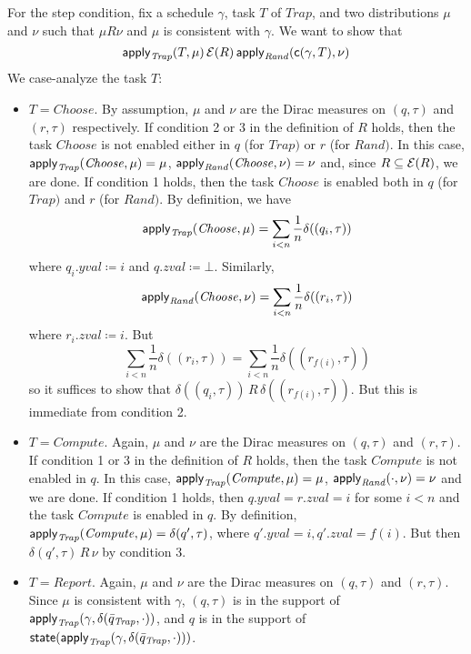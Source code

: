 \documentclass[10pt]{article}
\begin{document}
For the step condition, fix a schedule $\gamma$, task $T$ of $\mathit{Trap}$, and two distributions $\mu$ and $\nu$ such that $\mu R \nu$ and $\mu$ is consistent with $\gamma$. We want to show that 
\[ \mathsf{apply}_\mathit{Trap}(T,\mu) \, \mathcal{E}(R) \, \mathsf{apply}_\mathit{Rand}(\mathsf{c}(\gamma,T),\nu) \]
We case-analyze the task $T$:
\begin{itemize}
\item $T = \mathit{Choose}$. By assumption, $\mu$ and $\nu$ are the Dirac measures on $(q,\tau)$ and $(r,\tau)$ respectively. If condition 2 or 3 in the definition of $R$ holds, then the task $\mathit{Choose}$ is not enabled either in $q$ (for $\mathit{Trap})$ or $r$ (for $\mathit{Rand})$. In this case, $\mathsf{apply}_\mathit{Trap}(\mathit{Choose},\mu) = \mu$, $\mathsf{apply}_\mathit{Rand}(\mathit{Choose},\nu) = \nu$ and, since $R \subseteq \mathcal{E}(R)$, we are done. If condition 1 holds, then the task $\mathit{Choose}$ is enabled both in $q$ (for $\mathit{Trap})$ and $r$ (for $\mathit{Rand})$. By definition, we have
\[ \mathsf{apply}_\mathit{Trap}(\mathit{Choose},\mu) = \sum\limits_{i<n} \frac{1}{n} \delta((q_i,\tau)) \]
where $q_i.yval \coloneqq i$ and $q.zval \coloneqq \bot$. Similarly,
\[ \mathsf{apply}_\mathit{Rand}(\mathit{Choose},\nu) = \sum\limits_{i<n} \frac{1}{n} \delta((r_i,\tau)) \]
where $r_i.zval \coloneqq i$. But
\[ \sum\limits_{i<n} \frac{1}{n} \delta((r_i,\tau)) = \sum\limits_{i<n} \frac{1}{n} \delta((r_{f(i)},\tau)) \]
so it suffices to show that $\delta((q_i,\tau)) \, R \, \delta((r_{f(i)},\tau))$. But this is immediate from condition 2.
\item $T = \mathit{Compute}$. Again, $\mu$ and $\nu$ are the Dirac measures on $(q,\tau)$ and $(r,\tau)$. If condition 1 or 3 in the definition of $R$ holds, then the task $\mathit{Compute}$ is not enabled in $q$. In this case, $\mathsf{apply}_\mathit{Trap}(\mathit{Compute},\mu) = \mu$, $\mathsf{apply}_\mathit{Rand}(\cdot,\nu) = \nu$ and we are done. If condition 1 holds, then $q.yval = r.zval = i$ for some $i < n$ and the task $\mathit{Compute}$ is enabled in $q$. By definition, $\mathsf{apply}_\mathit{Trap}(\mathit{Compute},\mu) = \delta(q',\tau)$, where $q'.yval = i, q'.zval = f(i)$. But then $\delta(q',\tau) \, R \, \nu$ by condition 3. 
\item $T = \mathit{Report}$. Again, $\mu$ and $\nu$ are the Dirac measures on $(q,\tau)$ and $(r,\tau)$. Since $\mu$ is consistent with $\gamma$, $(q,\tau)$ is in the support of $\mathsf{apply}_\mathit{Trap}(\gamma,\delta(\bar{q}_\mathit{Trap},\cdot))$, and $q$ is in the support of $\mathsf{state}(\mathsf{apply}_\mathit{Trap}(\gamma,\delta(\bar{q}_\mathit{Trap},\cdot)))$.


\end{itemize}
\end{document}
